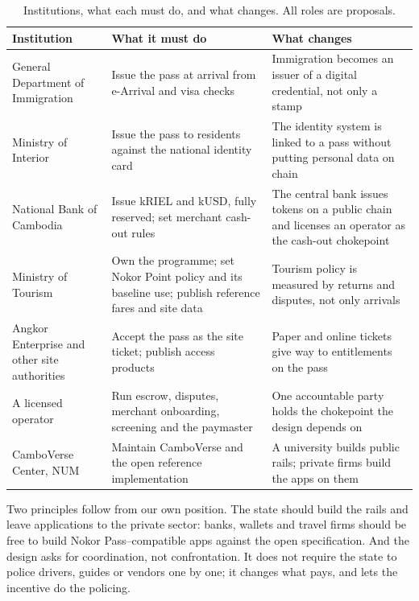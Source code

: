 \documentclass[10pt,letterpaper,twocolumn]{article}
\begin{document}
\begin{table}[t]
  \centering
  \small
  \caption{Institutions, what each must do, and what changes. All roles are proposals.}
  \label{tab:institutions}
  \begin{tabularx}{\textwidth}{@{}p{}p{}L@{}}
    \toprule
    Institution & What it must do & What changes \\
    \midrule
    General Department of Immigration & Issue the pass at arrival from e-Arrival and visa checks & Immigration becomes an issuer of a digital credential, not only a stamp \\
    Ministry of Interior & Issue the pass to residents against the national identity card & The identity system is linked to a pass without putting personal data on chain \\
    National Bank of Cambodia & Issue kRIEL and kUSD, fully reserved; set merchant cash-out rules & The central bank issues tokens on a public chain and licenses an operator as the cash-out chokepoint \\
    Ministry of Tourism & Own the programme; set Nokor Point policy and its baseline use; publish reference fares and site data & Tourism policy is measured by returns and disputes, not only arrivals \\
    Angkor Enterprise and other site authorities & Accept the pass as the site ticket; publish access products & Paper and online tickets give way to entitlements on the pass \\
    A licensed operator & Run escrow, disputes, merchant onboarding, screening and the paymaster & One accountable party holds the chokepoint the design depends on \\
    CamboVerse Center, NUM & Maintain CamboVerse and the open reference implementation & A university builds public rails; private firms build the apps on them \\
    \bottomrule
  \end{tabularx}
\end{table}

Two principles follow from our own position. The state should build the rails
and leave applications to the private sector: banks, wallets and travel firms
should be free to build Nokor Pass--compatible apps against the open
specification. And the design asks for coordination, not confrontation. It does
not require the state to police drivers, guides or vendors one by one; it
changes what pays, and lets the incentive do the policing.
\end{document}
